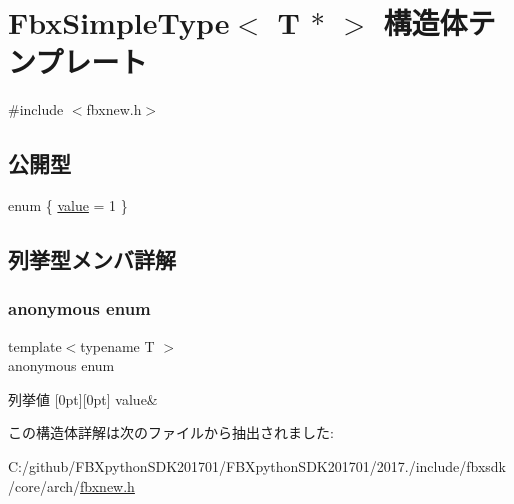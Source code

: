 \hypertarget{struct_fbx_simple_type_3_01_t_01_5_01_4}{}\section{Fbx\+Simple\+Type$<$ T $\ast$ $>$ 構造体テンプレート}
\label{struct_fbx_simple_type_3_01_t_01_5_01_4}


{\ttfamily \#include $<$fbxnew.\+h$>$}

\subsection*{公開型}
\begin{DoxyCompactItemize}
\item 
enum \{ \hyperlink{struct_fbx_simple_type_3_01_t_01_5_01_4_a69bce45e0e04d4577859d7f8a2f651cca620e3b3ec7cde5d1066733ba4ae1babe}{value} = 1
 \}
\end{DoxyCompactItemize}


\subsection{列挙型メンバ詳解}
\mbox{\label{struct_fbx_simple_type_3_01_t_01_5_01_4_a69bce45e0e04d4577859d7f8a2f651cc}} 
\subsubsection{\texorpdfstring{anonymous enum}{anonymous enum}}
{\footnotesize\ttfamily template$<$typename T $>$ \\
anonymous enum}

\begin{DoxyEnumFields}{列挙値}
[0pt][0pt]{}\mbox{\label{struct_fbx_simple_type_3_01_t_01_5_01_4_a69bce45e0e04d4577859d7f8a2f651cca620e3b3ec7cde5d1066733ba4ae1babe}} 
value&\\
\hline

\end{DoxyEnumFields}


この構造体詳解は次のファイルから抽出されました\+:\begin{DoxyCompactItemize}
\item 
C\+:/github/\+F\+B\+Xpython\+S\+D\+K201701/\+F\+B\+Xpython\+S\+D\+K201701/2017./include/fbxsdk/core/arch/\hyperlink{fbxnew_8h}{fbxnew.\+h}\end{DoxyCompactItemize}
